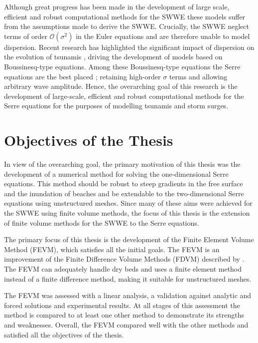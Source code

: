 
Although great progress has been made in the development of large scale, efficient and robust computational methods for the SWWE \cite{ClawPack,ANUGA} these models suffer from the assumptions made to derive the SWWE. Crucially, the SWWE neglect terms of order $\mathcal{O}\left(\sigma ^2\right)$ in the Euler equations and are therefore unable to model dispersion. Recent research has highlighted the significant impact of dispersion on the evolution of tsunamis \cite{Grue-etal-2008-113,Kirby-etal-2013-39}, driving the development of models based on Boussinesq-type equations. Among these Boussinesq-type equations the Serre equations are the best placed \cite{Bonneton-Lannes-2009-16601}; retaining high-order $\sigma$ terms and allowing arbitrary wave amplitude. Hence, the overarching goal of this research is the development of large-scale, efficient and robust computational methods for the Serre equations for the purposes of modelling tsunamis and storm surges.

\section{Objectives of the Thesis}
In view of the overarching goal, the primary motivation of this thesis was the development of a numerical method for solving the one-dimensional Serre equations. This method should be robust to steep gradients in the free surface and the inundation of beaches and be extendable to the two-dimensional Serre equations using unstructured meshes. Since many of these aims were achieved for the SWWE using finite volume methods, the focus of this thesis is the extension of finite volume methods for the SWWE to the Serre equations. 

The primary focus of this thesis is the development of the Finite Element Volume Method (FEVM), which satisfies all the initial goals. The FEVM is an improvement of the Finite Difference Volume Methods (FDVM) described by \citet{Zoppou-2014}. The FEVM can adequately handle dry beds and uses a finite element method instead of a finite difference method, making it suitable for unstructured meshes. 

The FEVM was assessed with a linear analysis, a validation against analytic and forced solutions and experimental results. At all stages of this assessment the method is compared to at least one other method to demonstrate its strengths and weaknesses. Overall, the FEVM compared well with the other methods and satisfied all the objectives of the thesis.

